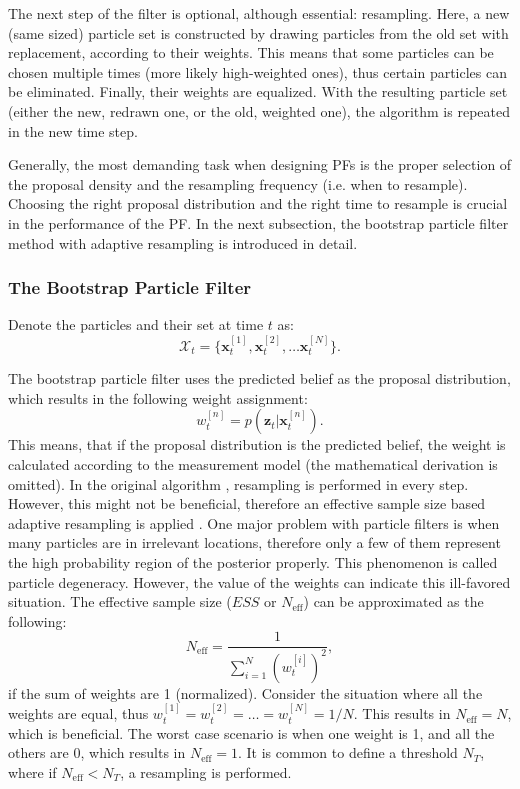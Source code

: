 The next step of the filter is optional, although essential: resampling. Here, a new (same sized) particle set is constructed by drawing particles from the old set with replacement, according to their weights. This means that some  particles can be chosen multiple times (more likely high-weighted ones), thus certain particles can be eliminated. Finally, their weights are equalized. With the resulting particle set (either the new, redrawn one, or the old, weighted one), the algorithm is repeated in the new time step.

Generally, the most demanding task when designing PFs is the proper selection of the proposal density and the resampling frequency (i.e. when to resample). Choosing the right proposal distribution and the right time to resample is crucial in the performance of the PF. In the next subsection, the bootstrap particle filter method with adaptive resampling is introduced in detail.
\subsubsection{The Bootstrap Particle Filter}

Denote the particles and their set at time $t$  as:
\begin{equation}\label{key}
    \mathcal{X}_t = \{\mathbf{x}_t^{[1]},\mathbf{x}_t^{[2]}, \dots \mathbf{x}_t^{[N]}\}.
\end{equation}

The bootstrap particle filter uses the predicted belief as the proposal distribution, which results in the following weight assignment:
\begin{equation}\label{key}
    w_t^{[n]} = p(\mathbf{z}_t|\mathbf{x}_t^{[n]}).
\end{equation}
This means, that  if the proposal distribution is the predicted belief, the weight is calculated according to the measurement model (the mathematical derivation is omitted). In the original algorithm \cite{Gordon1993}, resampling is performed in every step. However, this might not be beneficial, therefore an effective sample size based adaptive resampling is applied \cite{Liu2004}. One major problem with particle filters is when many particles are in irrelevant locations, therefore only a few of them represent the high probability region of the posterior properly. This phenomenon is called particle degeneracy. However, the value of the weights can indicate this ill-favored situation. The effective sample size ($ESS$ or $N_{\mathrm{eff}}$) can be approximated as the following:
\begin{equation}\label{eq:neff}
    N_{\mathrm{eff}} = \frac{1}{\sum_{i = 1}^{N}(w_t^{[i]})^2},
\end{equation}
if the sum of weights are 1 (normalized). Consider the situation where all the weights are equal, thus $w_t^{[1]} = w_t^{[2]} = \dots = w_t^{[N]} = 1/N$. This results in $N_{\mathrm{eff}} = N$, which is beneficial. The worst case scenario is when one weight is 1, and all the others are 0, which results in $N_{\mathrm{eff}} = 1$. It is common to define a threshold $N_{T}$, where if $N_{\mathrm{eff}} < N_T$, a resampling is performed.

